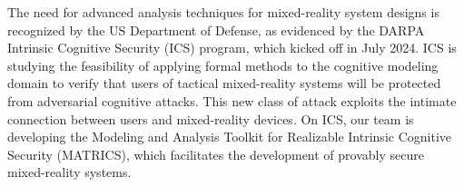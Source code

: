 The need for advanced analysis techniques for mixed-reality system designs is recognized by the US Department of Defense, as evidenced by the DARPA Intrinsic Cognitive Security (ICS) program, which kicked off in July 2024. ICS is studying the feasibility of applying formal methods to the cognitive modeling domain to verify that users of tactical mixed-reality systems will be protected from adversarial cognitive attacks. This new class of attack exploits the intimate connection between users and mixed-reality devices. 
%
On ICS, our team is developing the Modeling and Analysis Toolkit for Realizable Intrinsic Cognitive Security (MATRICS), which facilitates the development of provably secure mixed-reality systems. %
